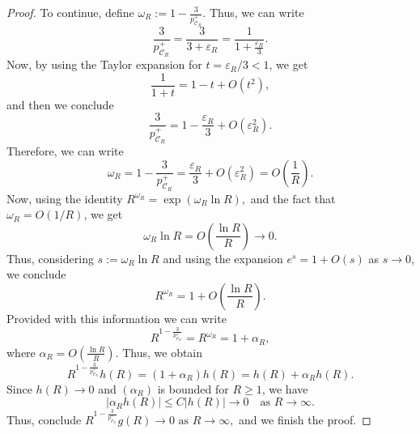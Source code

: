 \documentclass[a4paper,12pt]{amsart}
\theoremstyle{definition}
\theoremstyle{plain}
\begin{document}
\begin{proof}
To continue, define $
\omega_R := 1 - \frac{3}{p_{\mathcal{C}_R}^+}$.   Thus, we can write 
\[
\frac{3}{p_{\mathcal{C}_R}^+}
= \frac{3}{3 + \varepsilon_R}
= \frac{1}{1 + \frac{\varepsilon_R}{3}}.
\]
Now, by using the Taylor expansion for $t = \varepsilon_R/3 < 1$, we get 
\[
\frac{1}{1+t} = 1 - t + O(t^2),
\]
and then we conclude 
\[
\frac{3}{p_{\mathcal{C}_R}^+}
= 1 - \frac{\varepsilon_R}{3} + O(\varepsilon_R^2).
\]
Therefore, we can write 
\[
\omega_R
= 1 - \frac{3}{p_{\mathcal{C}_R}^+}
= \frac{\varepsilon_R}{3} + O(\varepsilon_R^2)
= O\!\left(\frac{1}{R}\right).
\]
Now, using the identity 
$
R^{\omega_R} = \exp(\omega_R \ln R),
$ 
and the fact that $\omega_R = O(1/R)$, we get
\[
\omega_R \ln R = O\!\left(\frac{\ln R}{R}\right) \to 0.
\]
Thus, considering $s:=\omega_R \ln R$ and using the expansion $e^s = 1 + O(s)$ as $s \to 0$, we conclude
\[
R^{\omega_R} = 1 + O\!\left(\frac{\ln R}{R}\right).
\]
Provided with this information   we can write
\[
R^{1 - \frac{3}{p_{\mathcal{C}_R}^+}} = R^{\omega_R}
= 1 + \alpha_R,
\]
where $\alpha_R = O\!\left(\frac{\ln R}{R}\right)$.
Thus, we obtain 
\[
R^{1 - \frac{3}{p_{\mathcal{C}_R}^+}} h(R)
= (1 + \alpha_R) h(R)
= h(R) + \alpha_R h(R).
\]
Since $h(R) \to 0$ and $(\alpha_R)$ is bounded for $R \geq 1$, we have
\[
|\alpha_R h(R)| \le C |h(R)| \to 0 \quad \text{as } R \to \infty.
\]
Thus, conclude 
$ 
R^{1 - \frac{3}{p_{\mathcal{C}_R}^+}} g(R) \to 0   \text{ as } R \to \infty,
$ 
and we finish the proof. 
\end{proof}
\end{document}
